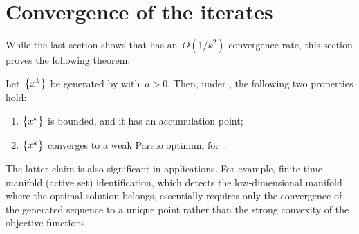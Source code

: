 \documentclass[../main]{subfiles}
\begin{document}
\section{Convergence of the iterates} 
While the last section shows that  has an~$O(1 / k^2)$ convergence rate, this section proves the following theorem:
\begin{theorem} 
    Let~$\set*{x^k}$ be generated by  with~$a > 0$.
    Then, under , the following two properties hold:
    \begin{enumerate}
        \item {} $\set*{x^k}$ is bounded, and it has an accumulation point;
        \item {} $\set*{x^k}$ converges to a weak Pareto optimum for~.
    \end{enumerate}
\end{theorem}
The latter claim is also significant in applications.
For example, finite-time manifold (active set) identification, which detects the low-dimensional manifold where the optimal solution belongs, essentially requires only the convergence of the generated sequence to a unique point rather than the strong convexity of the objective functions~\cite{Sun2019}.
\end{document}
